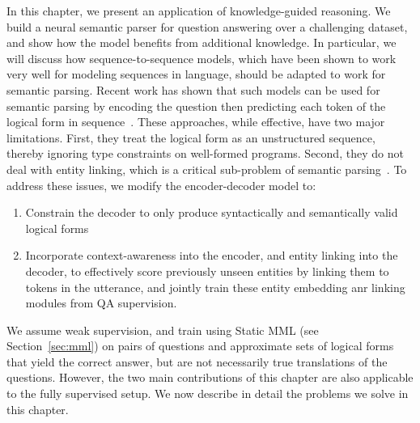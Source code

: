 In this chapter, we present an application of knowledge-guided reasoning. We
build a neural semantic parser for question answering over a challenging
dataset, and show how the model benefits from additional knowledge.  In
particular, we will discuss how sequence-to-sequence models, which have been
shown to work very well for modeling sequences in language, should be adapted to
work for semantic parsing.  Recent work has shown that such models can be used
for semantic parsing by encoding the question then predicting each token of the
logical form in sequence~\citep{jia2016,dong2016}.  These approaches, while
effective, have two major limitations.  First, they treat the logical form as an
unstructured sequence, thereby ignoring type constraints on well-formed
programs.  Second, they do not deal with entity linking, which is a critical
sub-problem of semantic parsing~\citep{yih2015stagg}.  To address these issues,
we modify the encoder-decoder model to:
\begin{enumerate}
	\item Constrain the decoder to only produce syntactically and semantically
		valid logical forms
	\item Incorporate context-awareness into the encoder, and entity linking
		into the decoder, to effectively score previously
		unseen entities by linking them to tokens in the
		utterance, and jointly train these entity embedding anr linking
		modules from QA supervision.
\end{enumerate}
We assume weak supervision, and train using Static MML (see Section~\ref{sec:mml})
on pairs of questions and approximate sets of logical forms that yield the correct answer,
but are not necessarily true translations of the questions. However, the two main
contributions of this chapter are also applicable to the fully supervised setup.
We now describe in detail the problems we solve in this chapter.

